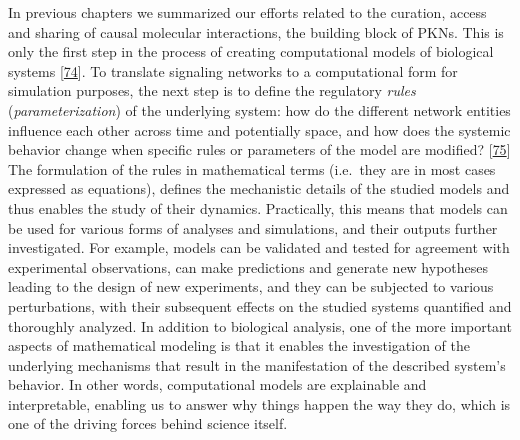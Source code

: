 \documentclass[
  12pt,
]{book}
\begin{document}
In previous chapters we summarized our efforts related to the curation, access and sharing of causal molecular interactions, the building block of PKNs.
This is only the first step in the process of creating computational models of biological systems {[}\protect\hyperlink{ref-Wang2012}{74}{]}.
To translate signaling networks to a computational form for simulation purposes, the next step is to define the regulatory \emph{rules} (\emph{parameterization}) of the underlying system: how do the different network entities influence each other across time and potentially space, and how does the systemic behavior change when specific rules or parameters of the model are modified? {[}\protect\hyperlink{ref-Aldridge2006}{75}{]}
The formulation of the rules in mathematical terms (i.e.~they are in most cases expressed as equations), defines the mechanistic details of the studied models and thus enables the study of their dynamics.
Practically, this means that models can be used for various forms of analyses and simulations, and their outputs further investigated.
For example, models can be validated and tested for agreement with experimental observations, can make predictions and generate new hypotheses leading to the design of new experiments, and they can be subjected to various perturbations, with their subsequent effects on the studied systems quantified and thoroughly analyzed.
In addition to biological analysis, one of the more important aspects of mathematical modeling is that it enables the investigation of the underlying mechanisms that result in the manifestation of the described system's behavior.
In other words, computational models are explainable and interpretable, enabling us to answer why things happen the way they do, which is one of the driving forces behind science itself.
\end{document}
